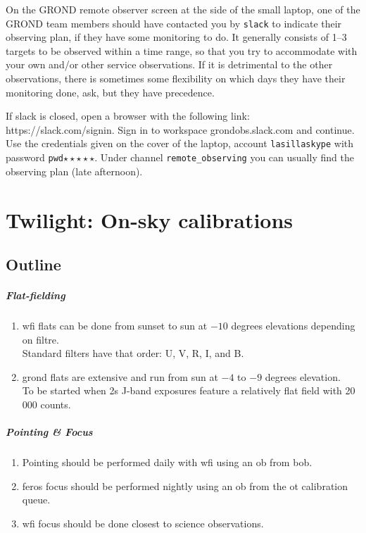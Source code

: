 \documentclass[11pt,fleqn]{book} %
\begin{document}
On the GROND remote observer screen at the side of the small laptop, one of the GROND team members should have contacted you by \texttt{slack} to indicate their observing plan, if they have some monitoring to do.  It generally consists of 1--3 targets to be observed within a time range, so that you try to accommodate with your own and/or other service observations.  If it is detrimental to the other observations, there is sometimes some flexibility on which days they have their monitoring done, ask, but they have precedence.

If slack is closed, open a browser with the following link: https://slack.com/signin. Sign in to workspace grondobs.slack.com and continue. Use the credentials given on the cover of the laptop, account \texttt{lasillaskype} with password \texttt{pwd}$\star\star\star\star\star$. Under channel \texttt{remote\_observing} you can usually find the observing plan (late afternoon). 



\chapter{Twilight: On-sky calibrations}
\label{nightcal}


\section{Outline}

\paragraph{Flat-fielding}
\begin{enumerate}
  \item \gls{wfi} flats can be done from sunset to sun at $-10$ degrees elevations depending on filtre.\\
        Standard filters have that order: U, V, R, I, and B.
  \item \gls{grond} flats are extensive and run from sun at $-4$ to $-9$ degrees elevation.\\
        To be started when 2s J-band exposures feature a
        relatively flat field with 20\,000 counts.
\end{enumerate}

\paragraph{Pointing \& Focus}
\begin{enumerate}
  \item Pointing should be performed daily with \gls{wfi}
        using an \gls{ob} from \gls{bob}.
  \item \gls{feros} focus should be performed nightly using an \gls{ob} from
        the \gls{ot} calibration queue.
  \item \gls{wfi} focus should be done closest to science observations.
\end{enumerate} 
\end{document}
